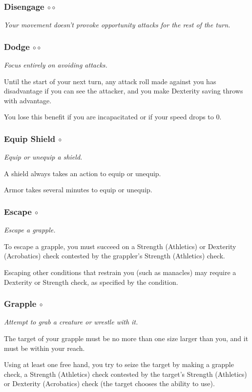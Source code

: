 \subsubsection{Disengage $\circ\circ$}
    \textit{Your movement doesn't provoke opportunity attacks for the rest of the turn.}

\subsubsection{Dodge $\circ\circ$}
    \textit{Focus entirely on avoiding attacks.}

    Until the start of your next turn, any attack roll made against you has disadvantage if you can see the attacker, and you make Dexterity saving throws with advantage.

    You lose this benefit if you are incapacitated or if your speed drops to 0.

\subsubsection{Equip Shield $\circ$}
    \textit{Equip or unequip a shield.}

    A shield always takes an action to equip or unequip.

    Armor takes several minutes to equip or unequip.

\subsubsection{Escape $\circ$}
    \textit{Escape a grapple.}

    To escape a grapple, you must succeed on a Strength (Athletics) or Dexterity (Acrobatics) check contested by the grappler's Strength (Athletics) check.

    Escaping other conditions that restrain you (such as manacles) may require a Dexterity or Strength check, as specified by the condition.

\subsubsection{Grapple $\circ$}
    \textit{Attempt to grab a creature or wrestle with it.}

    The target of your grapple must be no more than one size larger than you, and it must be within your reach.

    Using at least one free hand, you try to seize the target by making a grapple check, a Strength (Athletics) check contested by the target's Strength (Athletics) or Dexterity (Acrobatics) check (the target chooses the ability to use).

